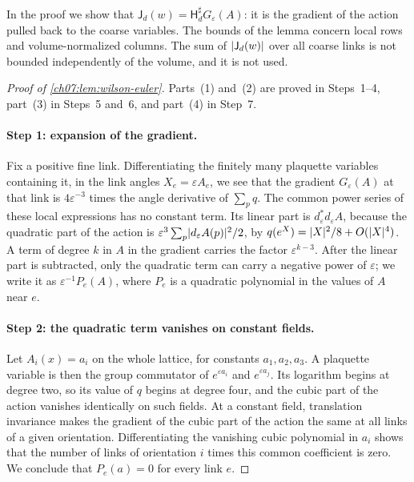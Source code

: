 In the proof we show that $\mathsf J_d(w)=\mathsf H_d^\sharp G_\varepsilon(A)$: it is the gradient of the action pulled back to the coarse variables. The bounds of the lemma concern local rows and volume-normalized columns. The sum of $\lvert \mathsf J_d(w)\rvert$ over all coarse links is not bounded independently of the volume, and it is not used.

\begin{proof}[Proof of \cref{ch07:lem:wilson-euler}]
Parts~(1) and~(2) are proved in Steps~1--4, part~(3) in Steps~5 and~6, and part~(4) in Step~7.

\paragraph{Step 1: expansion of the gradient.}
Fix a positive fine link. Differentiating the finitely many plaquette variables containing it, in the link angles $X_e=\varepsilon A_e$, we see that the gradient $G_\varepsilon(A)$ at that link is $4\varepsilon^{-3}$ times the angle derivative of $\sum_pq$. The common power series of these local expressions has no constant term. Its linear part is $d_\varepsilon^*d_\varepsilon A$, because the quadratic part of the action is $\varepsilon^3\sum_p\lvert d_\varepsilon A(p)\rvert^2/2$, by $q(e^X)=\lvert X\rvert^2/8+O(\lvert X\rvert^4)$. A term of degree $k$ in $A$ in the gradient carries the factor $\varepsilon^{k-3}$. After the linear part is subtracted, only the quadratic term can carry a negative power of $\varepsilon$; we write it as $\varepsilon^{-1}P_e(A)$, where $P_e$ is a quadratic polynomial in the values of $A$ near $e$.

\paragraph{Step 2: the quadratic term vanishes on constant fields.}
Let $A_i(x)=a_i$ on the whole lattice, for constants $a_1,a_2,a_3$. A plaquette variable is then the group commutator of $e^{\varepsilon a_i}$ and $e^{\varepsilon a_j}$. Its logarithm begins at degree two, so its value of $q$ begins at degree four, and the cubic part of the action vanishes identically on such fields. At a constant field, translation invariance makes the gradient of the cubic part of the action the same at all links of a given orientation. Differentiating the vanishing cubic polynomial in $a_i$ shows that the number of links of orientation $i$ times this common coefficient is zero. We conclude that $P_e(a)=0$ for every link $e$.


\end{proof}
